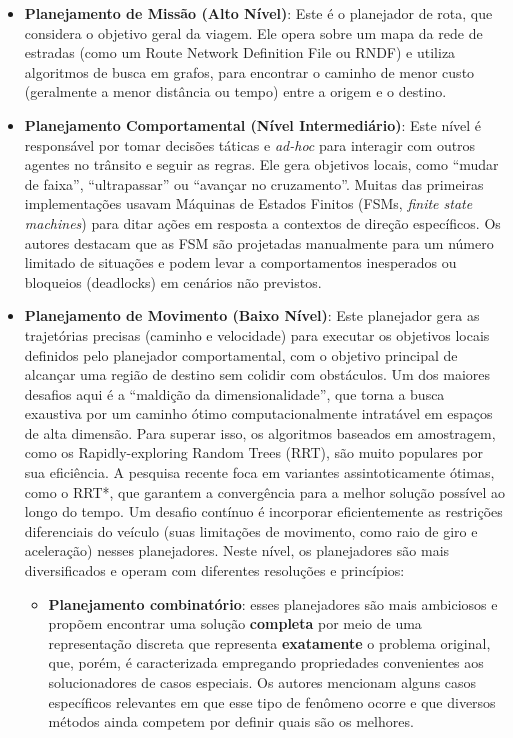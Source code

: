 \begin{itemize}
    \item \textbf{Planejamento de Missão (Alto Nível)}: Este é o planejador de rota, que considera o objetivo geral da viagem. Ele opera sobre um mapa da rede de estradas (como um Route Network Definition File ou RNDF) e utiliza algoritmos de busca em grafos, para encontrar o caminho de menor custo (geralmente a menor distância ou tempo) entre a origem e o destino.
    \item \textbf{Planejamento Comportamental (Nível Intermediário)}: Este nível é responsável por tomar decisões táticas e \textit{ad-hoc} para interagir com outros agentes no trânsito e seguir as regras. Ele gera objetivos locais, como ``mudar de faixa'', ``ultrapassar'' ou ``avançar no cruzamento''. Muitas das primeiras implementações usavam Máquinas de Estados Finitos (FSMs, \textit{finite state machines}) para ditar ações em resposta a contextos de direção específicos. Os autores destacam que as FSM são projetadas manualmente para um número limitado de situações e podem levar a comportamentos inesperados ou bloqueios (deadlocks) em cenários não previstos.
    \item \textbf{Planejamento de Movimento (Baixo Nível)}: Este planejador gera as trajetórias precisas (caminho e velocidade) para executar os objetivos locais definidos pelo planejador comportamental, com o objetivo principal de alcançar uma região de destino sem colidir com obstáculos. Um dos maiores desafios aqui é a ``maldição da dimensionalidade'', que torna a busca exaustiva por um caminho ótimo computacionalmente intratável em espaços de alta dimensão. Para superar isso, os algoritmos baseados em amostragem, como os Rapidly-exploring Random Trees (RRT), são muito populares por sua eficiência. A pesquisa recente foca em variantes assintoticamente ótimas, como o RRT*, que garantem a convergência para a melhor solução possível ao longo do tempo. Um desafio contínuo é incorporar eficientemente as restrições diferenciais do veículo (suas limitações de movimento, como raio de giro e aceleração) nesses planejadores. Neste nível, os planejadores são mais diversificados e operam com diferentes resoluções e princípios:
    \begin{itemize}
        \item \textbf{Planejamento combinatório}: esses planejadores são mais ambiciosos e propõem encontrar uma solução \textbf{completa} por meio de uma representação discreta que representa \textbf{exatamente} o problema original, que, porém, é caracterizada empregando propriedades convenientes aos solucionadores de casos especiais. Os autores mencionam alguns casos específicos relevantes em que esse tipo de fenômeno ocorre e que diversos métodos ainda competem por definir quais são os melhores.

\end{itemize}
\end{itemize}
